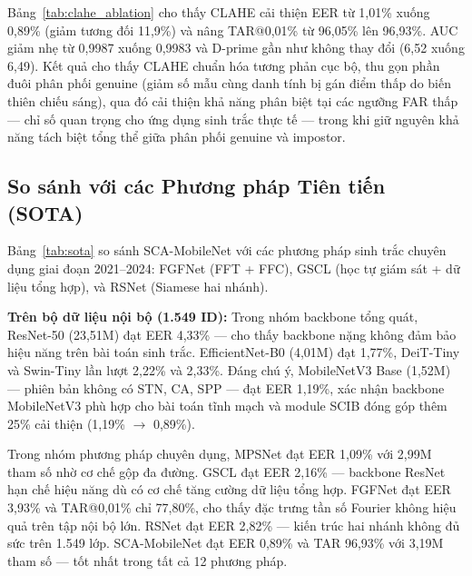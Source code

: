 \documentclass[12pt,a4paper]{article}
\begin{document}
Bảng~\ref{tab:clahe_ablation} cho thấy CLAHE cải thiện EER từ 1,01\% xuống 0,89\% (giảm tương đối 11,9\%) và nâng TAR@0,01\% từ 96,05\% lên 96,93\%. AUC giảm nhẹ từ 0,9987 xuống 0,9983 và D-prime gần như không thay đổi (6,52 xuống 6,49). Kết quả cho thấy CLAHE chuẩn hóa tương phản cục bộ, thu gọn phần đuôi phân phối genuine (giảm số mẫu cùng danh tính bị gán điểm thấp do biến thiên chiếu sáng), qua đó cải thiện khả năng phân biệt tại các ngưỡng FAR thấp --- chỉ số quan trọng cho ứng dụng sinh trắc thực tế --- trong khi giữ nguyên khả năng tách biệt tổng thể giữa phân phối genuine và impostor.

\subsection{So sánh với các Phương pháp Tiên tiến (SOTA)}

Bảng~\ref{tab:sota} so sánh SCA-MobileNet với các phương pháp sinh trắc chuyên dụng giai đoạn 2021--2024: FGFNet \cite{b5} (FFT + FFC), GSCL \cite{b3} (học tự giám sát + dữ liệu tổng hợp), và RSNet \cite{b4} (Siamese hai nhánh).

\textbf{Trên bộ dữ liệu nội bộ (1.549 ID):}
Trong nhóm backbone tổng quát, ResNet-50 (23,51M) đạt EER 4,33\% --- cho thấy backbone nặng không đảm bảo hiệu năng trên bài toán sinh trắc. EfficientNet-B0 (4,01M) đạt 1,77\%, DeiT-Tiny và Swin-Tiny lần lượt 2,22\% và 2,33\%. Đáng chú ý, MobileNetV3 Base (1,52M) --- phiên bản không có STN, CA, SPP --- đạt EER 1,19\%, xác nhận backbone MobileNetV3 phù hợp cho bài toán tĩnh mạch và module SCIB đóng góp thêm 25\% cải thiện (1,19\% $\rightarrow$ 0,89\%).

Trong nhóm phương pháp chuyên dụng, MPSNet đạt EER 1,09\% với 2,99M tham số nhờ cơ chế gộp đa đường. GSCL đạt EER 2,16\% --- backbone ResNet hạn chế hiệu năng dù có cơ chế tăng cường dữ liệu tổng hợp. FGFNet đạt EER 3,93\% và TAR@0,01\% chỉ 77,80\%, cho thấy đặc trưng tần số Fourier không hiệu quả trên tập nội bộ lớn. RSNet đạt EER 2,82\% --- kiến trúc hai nhánh không đủ sức trên 1.549 lớp. SCA-MobileNet đạt EER 0,89\% và TAR 96,93\% với 3,19M tham số --- tốt nhất trong tất cả 12 phương pháp.
\end{document}
